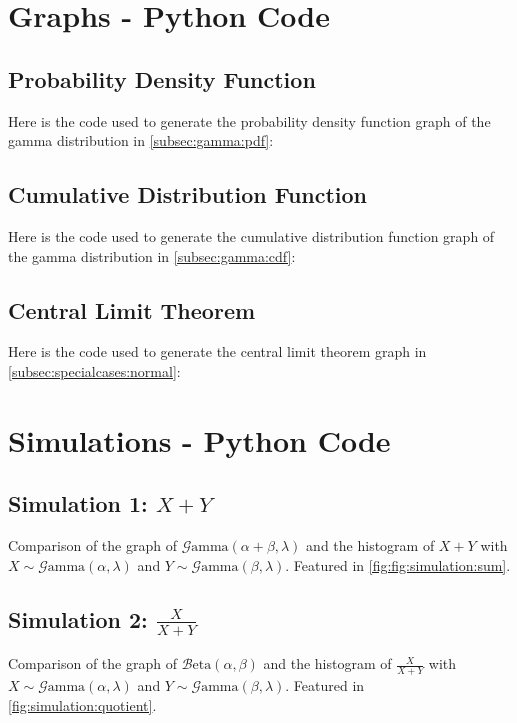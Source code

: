\documentclass[12pt]{article}
\newcommand{\B}{\mathcal{B}}
\newcommand{\G}{\mathcal{G}}
\begin{document}
\begin{appendix}
\section{Graphs - Python Code}
\subsection{Probability Density Function}
Here is the code used to generate the probability density function graph of the gamma distribution in
\autoref{subsec:gamma:pdf}:


\pagebreak
\subsection{Cumulative Distribution Function}
Here is the code used to generate the cumulative distribution function graph of the gamma distribution in
\autoref{subsec:gamma:cdf}:


\pagebreak
\subsection{Central Limit Theorem}
Here is the code used to generate the central limit theorem graph in \autoref{subsec:specialcases:normal}:


\pagebreak
\section{Simulations - Python Code}
\subsection{Simulation 1: $X+Y$}
Comparison of the graph of $\G\text{amma}(\alpha+\beta, \lambda)$ and the histogram of $X+Y$ with
$X\sim\G\text{amma}(\alpha, \lambda)$ and $Y\sim\G\text{amma}(\beta, \lambda)$. Featured in
\autoref{fig:fig:simulation:sum}.


\pagebreak
\subsection{Simulation 2: $\frac{X}{X+Y}$}
Comparison of the graph of $\B\text{eta}(\alpha, \beta)$ and the histogram of $\frac{X}{X+Y}$ with
$X\sim\G\text{amma}(\alpha, \lambda)$ and $Y\sim\G\text{amma}(\beta, \lambda)$. Featured in
\autoref{fig:simulation:quotient}.


\pagebreak
{}\listoffigures
\end{appendix}

\pagebreak{}\printbibliography[heading=bibintoc, title={References}]
\end{document}
